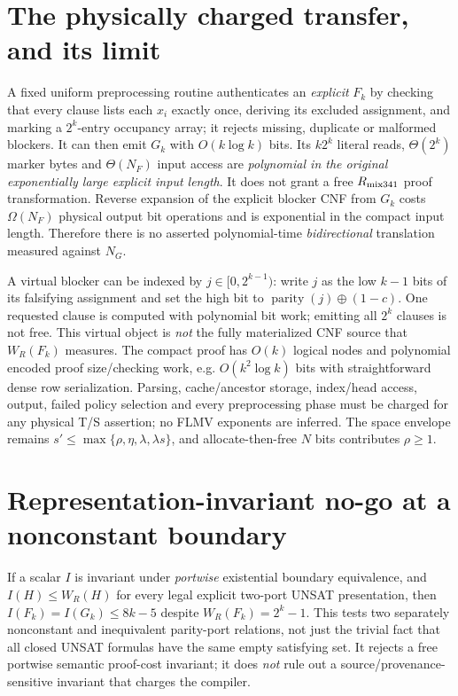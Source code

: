 \documentclass[11pt]{article}
\begin{document}
\section*{The physically charged transfer, and its limit}
A fixed uniform preprocessing routine authenticates an \emph{explicit} $F_k$ by checking that every clause lists each $x_i$ exactly once, deriving its excluded assignment, and marking a $2^k$-entry occupancy array; it rejects missing, duplicate or malformed blockers. It can then emit $G_k$ with $O(k\log k)$ bits. Its $k2^k$ literal reads, $\Theta(2^k)$ marker bytes and $\Theta(N_F)$ input access are \emph{polynomial in the original exponentially large explicit input length}. It does not grant a free $R_{\rm mix341}$ proof transformation. Reverse expansion of the explicit blocker CNF from $G_k$ costs $\Omega(N_F)$ physical output bit operations and is exponential in the compact input length. Therefore there is no asserted polynomial-time \emph{bidirectional} translation measured against $N_G$.

A virtual blocker can be indexed by $j\in[0,2^{k-1})$: write $j$ as the low $k-1$ bits of its falsifying assignment and set the high bit to $\operatorname{parity}(j)\oplus(1-c)$. One requested clause is computed with polynomial bit work; emitting all $2^k$ clauses is not free. This virtual object is \emph{not} the fully materialized CNF source that $W_R(F_k)$ measures. The compact proof has $O(k)$ logical nodes and polynomial encoded proof size/checking work, e.g. $O(k^2\log k)$ bits with straightforward dense row serialization. Parsing, cache/ancestor storage, index/head access, output, failed policy selection and every preprocessing phase must be charged for any physical T/S assertion; no FLMV exponents are inferred. The space envelope remains $s'\le\max\{\rho,\eta,\lambda,\lambda s\}$, and allocate-then-free $N$ bits contributes $\rho\ge1$.

\section*{Representation-invariant no-go at a nonconstant boundary}
If a scalar $I$ is invariant under \emph{portwise} existential boundary equivalence, and $I(H)\le W_R(H)$ for every legal explicit two-port UNSAT presentation, then
$I(F_k)=I(G_k)\le8k-5$ despite $W_R(F_k)=2^k-1$. This tests two separately nonconstant and inequivalent parity-port relations, not just the trivial fact that all closed UNSAT formulas have the same empty satisfying set. It rejects a free portwise semantic proof-cost invariant; it does \emph{not} rule out a source/provenance-sensitive invariant that charges the compiler.
\end{document}
